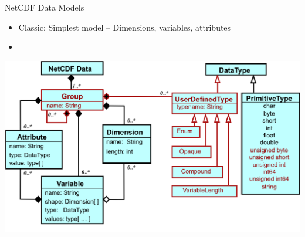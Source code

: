 \documentclass[compress,11pt,xcolor=svgnames,aspectratio=169]{beamer}
\begin{document}
\begin{frame}[fragile]{NetCDF Data Models}

    \begin{itemize}

        \item Classic: Simplest model -- Dimensions, variables, attributes

        \item {\color{red}{Enhanced: More powerful model -- Adds groups, types, nesting}}

    \end{itemize}

    \begin{center}
    \includegraphics[scale=0.45]{fig/nc4-uml}
    \end{center}

\nocite{netcdf}

\end{frame}
\end{document}
